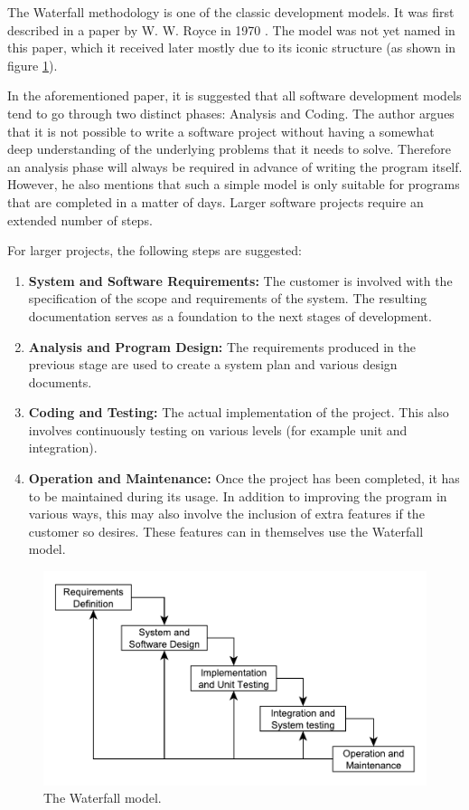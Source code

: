 The Waterfall methodology is one of the classic development models. It was first described in a paper by W. W. Royce in 1970 \cite{waterfall}.  The model was not yet named in this paper, which it received later mostly due to its iconic structure (as shown in figure \ref{waterfall}).

In the aforementioned paper, it is suggested that all software development models tend to go through two distinct phases: Analysis and Coding. The author argues that it is not possible to write a software project without having a somewhat deep understanding of the underlying problems that it needs to solve. Therefore an analysis phase will always be required in advance of writing the program itself. However, he also mentions that such a simple model is only suitable for programs that are completed in a matter of days. Larger software projects require an extended number of steps.

For larger projects, the following steps are suggested:
\begin{enumerate}
	\item \textbf{System and Software Requirements:} The customer is involved with the specification of the scope and requirements of the system. The resulting documentation serves as a foundation to the next stages of development.
	\item \textbf{Analysis and Program Design:} The requirements produced in the previous stage are used to create a system plan and various design documents.
	\item \textbf{Coding and Testing:} The actual implementation of the project. This also involves continuously testing on various levels (for example unit and integration).
	\item \textbf{Operation and Maintenance:} Once the project has been completed, it has to be maintained during its usage. In addition to improving the program in various ways, this may also involve the inclusion of extra features if the customer so desires. These features can in themselves use the Waterfall model.
\end{enumerate}

\begin{figure}
\centering
\includegraphics[width=150mm]{images/chapters/development_models/waterfall.pdf}
\caption{The Waterfall model.}
\label{waterfall}
\end{figure}

